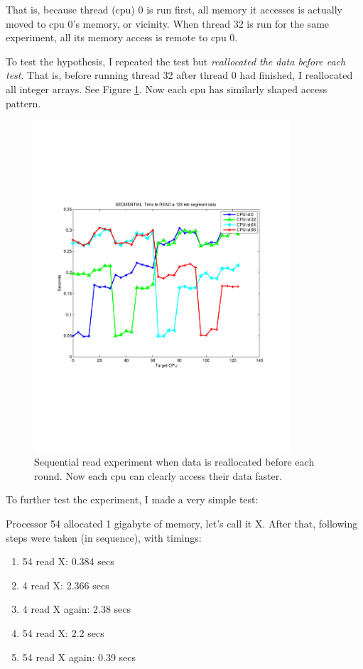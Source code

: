 \documentclass[12pt]{article}
\begin{document}
That is, because thread (cpu) 0 is run first, all memory it accesses is actually moved to cpu 0's memory, or vicinity. When thread 32 is run for the same experiment, all its memory access is remote to cpu 0.

To test the hypothesis, I repeated the test but \emph{reallocated the data before each test}. That is, before running thread 32 after thread 0 had finished, I reallocated all integer arrays. See Figure \ref{figseq2}. Now each cpu has similarly shaped access pattern.

\begin{figure}[H]
\includegraphics[width=0.85\textwidth]{blacklight_seq_access.pdf}
\caption{Sequential read experiment when data is reallocated before each round. Now each cpu can clearly access their data faster.
}
\label{figseq2}
\end{figure}


To further test the experiment, I made a very simple test:

Processor 54 allocated 1 gigabyte of memory, let's call it X. After that, following steps were taken (in sequence), 
with timings:

\begin{enumerate}
\item 54 read X:  0.384 secs

\item 4 read X: 2.366 secs

\item 4 read X again: 2.38 secs

\item 54 read X: 2.2 secs

\item 54 read X again: 0.39 secs
\end{enumerate}
\end{document}
